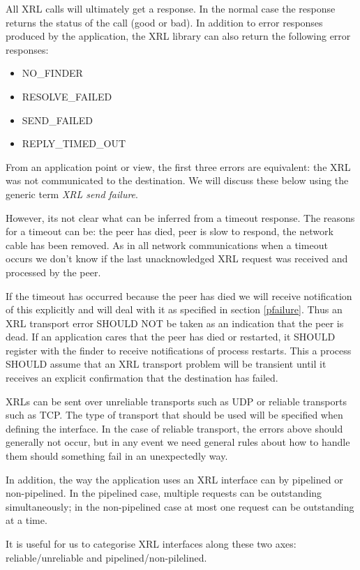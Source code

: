 \documentclass[11pt]{article}
\begin{document}
All XRL calls will ultimately get a response. In the normal case the
response returns the status of the call (good or bad). In addition to
error responses produced by the application, the XRL library can also
return the following error responses:
\begin{itemize}
\item NO\_FINDER
\item RESOLVE\_FAILED
\item SEND\_FAILED
\item REPLY\_TIMED\_OUT
\end{itemize}
From an application point or view, the first three errors are
equivalent: the XRL was not communicated to the destination.  We will
discuss these below using the generic term {\em XRL send failure}.

However, its not clear what can be inferred from a timeout
response. The reasons for a timeout can be: the peer has died, peer is
slow to respond, the network cable has been removed. As in all network
communications when a timeout occurs we don't know if the last
unacknowledged XRL request was received and processed by the peer.

If the timeout has occurred because the peer has died we will receive
notification of this explicitly and will deal with it as specified in
section \ref{pfailure}.  Thus an XRL transport error SHOULD NOT be
taken as an indication that the peer is dead.  If an application cares
that the peer has died or restarted, it SHOULD register with the
finder to receive notifications of process restarts.  This a process
SHOULD assume that an XRL transport problem will be transient until it
receives an explicit confirmation that the destination has failed. 

XRLs can be sent over unreliable transports such as UDP or reliable
transports such as TCP. The type of transport that should be used will
be specified when defining the interface. In the case of reliable
transport, the errors above should generally not occur, but in any
event we need general rules about how to handle them should something
fail in an unexpectedly way.

In addition, the way the application uses an XRL interface can by
pipelined or non-pipelined.  In the pipelined case, multiple requests
can be outstanding simultaneously; in the non-pipelined case at most
one request can be outstanding at a time.

It is useful for us to categorise XRL interfaces along these two axes:
reliable/unreliable and pipelined/non-pilelined.
\end{document}
